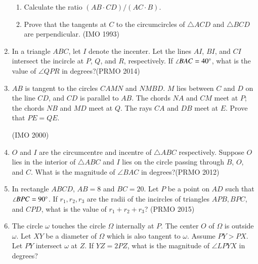 \begin{enumerate}[label=\thesubsection.\arabic*,ref=\thesubsection.\theenumi]
\begin{enumerate}
\item Calculate the ratio $(AB \cdot CD) / (AC \cdot B)$.
\item Prove that the tangents at $C$ to the circumcircles of $\triangle ACD$ and $\triangle BCD$ are perpendicular. \hfill(IMO  1993)
\end{enumerate}
\item In a triangle $ABC$, let $I$ denote the incenter. Let the lines $AI$, $BI$, and $CI$ intersect the incircle at $P$, $Q$, and $R$, respectively. If $\angle BAC = 40\degree$, what is the value of $\angle QPR$ in degrees?\hfill(PRMO 2014)
\item $AB$ is tangent to the circles $CAMN$ and $NMBD$. $M$ lies between $C$ and $D$ on the line $CD$, and $CD$ is parallel to $AB$. The chords $NA$ and $CM$ meet at $P$; the chords $NB$ and $MD$ meet at $Q$. The rays $CA$ and $DB$ meet at $E$. Prove that $PE = QE$.

	\hfill(IMO 2000)
\item $O$ and $I$ are the circumcentre and incentre of $\triangle ABC$ respectively. Suppose $O$ lies in the interior of $\triangle ABC$ and $I$ lies on the circle passing through $B$, $O$, and $C$. What is the magnitude of $\angle BAC$ in degrees?\hfill(PRMO 2012)
    \item In rectangle $ ABCD $, $ AB = 8 $ and $ BC = 20 $. Let $ P $ be a point on $ AD $ such that $ \angle BPC = 90\degree $. If $ r_1, r_2, r_3 $ are the radii of the incircles of triangles $ APB, BPC $, and $ CPD $, what is the value of $ r_1 + r_2 + r_3 $? \hfill(PRMO 2015)
\item The circle $ \omega $ touches the circle $ \Omega $ internally at $ P $. The center $ O $ of $ \Omega $ is outside $ \omega $. Let $XY$ be a diameter of $ \Omega $ which is also tangent to $ \omega $. Assume $ PY > PX $. Let $ PY $ intersect $ \omega $ at $ Z $. If $ YZ = 2PZ $, what is the magnitude of $ \angle LPYX $ in degrees? 


\end{enumerate}
